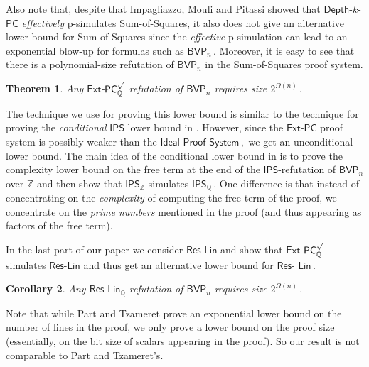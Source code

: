 \documentclass[11pt]{article}
\newtheorem{theorem}{Theorem}[section]
\newtheorem{corollary}[theorem]{Corollary}
\newcommand{\Q}{{\mathbb Q}}
\newcommand{\Z}{{\mathbb Z}}
\begin{document}
Also note that, despite that Impagliazzo, Mouli and Pitassi \cite{IMP19_new} showed that $\mathsf{Depth}$-$k$-$\mathsf{PC}$ \textit{effectively} p-simulates Sum-of-Squares, it also does not give an alternative lower bound for  Sum-of-Squares since the \textit{effective} p-simulation can lead to an exponential blow-up for formulas such as %
$\mathsf{BVP}_n\,.$ %
 Moreover, it is easy to see that there is a polynomial-size refutation of $\mathsf{BVP}_n$ in the Sum-of-Squares proof system.

\begin{theorem}
Any $\mathsf{Ext}$-$\mathsf{PC}_{\Q}^{\surd}$ refutation of $\mathsf{BVP}_n$  requires size %
$2^{\Omega(n)}\,.$ %
\end{theorem}

The technique we use for proving this lower bound is similar to the technique for proving the \textit{conditional} $\mathsf{IPS}$ lower bound in \cite{AGHT19_new}.
However, since
the  %
$\mathsf{Ext}$-$\mathsf{PC}$ proof system is possibly weaker than the $\mathsf{Ideal}$ $\mathsf{Proof}$ %
$\mathsf{System}\,,$ %
we get an unconditional lower bound. The main idea of the conditional lower bound in \cite{AGHT19_new} is to prove the complexity lower bound on the free term %
at  %
the end of the $\mathsf{IPS}$-refutation of $\mathsf{BVP}_n$ over $\Z$ and then show that $\mathsf{IPS}_\Z$ simulates %
$\mathsf{IPS}_{\Q}\,.$ %
One difference is that instead of concentrating on the \emph{complexity} of computing the free term of the proof, we concentrate on the \emph{prime numbers}
%
mentioned in the proof (and thus appearing as factors of the free term).

%
In the last part of our paper  %
%
we consider $\mathsf{Res}$-$\mathsf{Lin}$ and show that $\mathsf{Ext}$-$\mathsf{PC}_{\Q}^{\surd}$ simulates $\mathsf{Res}$-$\mathsf{Lin}$ 
and thus get an alternative lower bound for $\mathsf{Res}$-%
$\mathsf{Lin}\,.$ %

\begin{corollary}
Any $\mathsf{Res}$-$\mathsf{Lin}_{\Q}$ refutation of $\mathsf{BVP}_n$ requires size %
$2^{\Omega(n)}\,.$ %
\end{corollary}

Note that while Part and Tzameret \cite{PT18_new} prove an exponential lower bound on the number of lines in the proof, we %
%
only prove a lower bound %
on the proof size (essentially, on the bit size of scalars appearing in the proof). 
%
%
%
%
So our result is not comparable to Part and Tzameret's.  %
%
\end{document}
